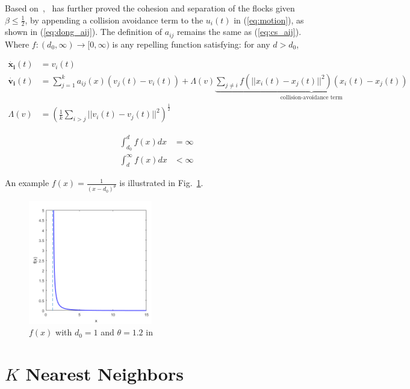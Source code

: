 Based on~\cite{CuckerSmale2007},~\cite{CuckerDong2010} has further proved the cohesion and separation of the flocks given $\beta\leq\frac{1}{2}$, by appending a collision avoidance term to the $u_i(t)$ in (\ref{eq:motion}), as shown in (\ref{eq:dong_aij}). The definition of $a_{ij}$ remains the same as (\ref{eq:cs_aij}). Where $f:(d_0,\infty)\to[0,\infty)$ is any repelling function satisfying: for any $d>d_0$,

\begin{equation}\label{eq:dong_aij}
\begin{aligned}
\dot{\mathbf{x_i}}(t)&=v_i(t)\\
\dot{\mathbf{v_i}}(t)&=\sum^k_{j=1}a_{ij}(x)(v_j(t)-v_i(t))+\Lambda(v)\underbrace{\sum_{j\neq i}f(||x_i(t)-x_j(t)||^2)(x_i(t)-x_j(t))}_{\text{collision-avoidance term}}\\
\Lambda(v)&=(\frac{1}{k}\sum_{i>j}||v_i(t)-v_j(t)||^2)^{\frac{1}{2}}
\end{aligned}
\end{equation}

\begin{equation}\label{eq:dong_f}
\begin{aligned}
\int_{d_0}^d f(x)dx&=\infty\\
\int_d^{\infty} f(x)dx&<\infty
\end{aligned}
\end{equation}

An example $f(x)=\frac{1}{(x-d_0)^{\theta}}$ is illustrated in Fig.~\ref{fig:dong_f}.

\begin{figure}[htb]
  \centering
  \includegraphics[width=0.48\textwidth]{figure/chapter_2/dong_f.png}
  \caption{$f(x)$ with $d_0=1$ and $\theta=1.2$ in ~\cite{CuckerDong2010}}
  \label{fig:dong_f}
\end{figure}

\section{$K$ Nearest Neighbors}

